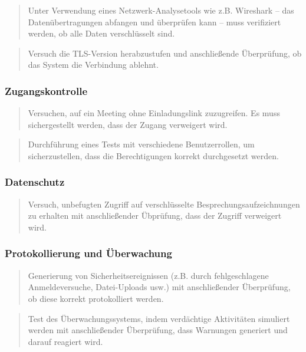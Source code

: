 \documentclass{article}
\begin{document}
\begin{quote}
Unter Verwendung eines Netzwerk-Analysetools wie z.B. Wireshark – das 
Datenübertragungen abfangen und überprüfen kann – muss verifiziert werden, ob alle Daten 
verschlüsselt sind.	
\end{quote}

\begin{quote}
Versuch die TLS-Version herabzustufen und anschließende Überprüfung, ob das System die 
Verbindung ablehnt.
\end{quote}

\subsubsection*{Zugangskontrolle}

\begin{quote}
Versuchen, auf ein Meeting ohne Einladungslink zuzugreifen. Es muss sichergestellt 
werden, dass der Zugang verweigert wird.
\end{quote}

\begin{quote}
Durchführung eines Tests mit verschiedene Benutzerrollen, um sicherzustellen, dass die 
Berechtigungen korrekt durchgesetzt werden.
\end{quote}

\subsubsection*{Datenschutz}

\begin{quote}
Versuch, unbefugten Zugriff auf verschlüsselte Besprechungsaufzeichnungen zu 
erhalten mit anschließender Übprüfung, dass der Zugriff verweigert wird.
\end{quote}

\subsubsection*{Protokollierung und Überwachung}

\begin{quote}
Generierung von Sicherheitsereignissen (z.B. durch fehlgeschlagene Anmeldeversuche, 
Datei-Uploads usw.) mit anschließender Überprüfung, ob diese korrekt protokolliert 
werden.
\end{quote}

\begin{quote}
Test des Überwachungssystems, indem verdächtige Aktivitäten simuliert werden mit 
anschließender Überprüfung, dass Warnungen generiert und darauf reagiert wird.
\end{quote}
\end{document}
